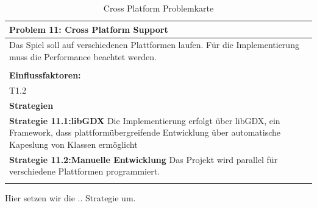 \documentclass[fontsize=12pt,paper=a4,twoside]{scrartcl}
\begin{document}
\begin{table}[H]
    \centering
    \begin{tabular}{|p{15cm}|}
    \hline
          \textbf{Problem 11: Cross Platform Support}  \\ \hline
	Das Spiel soll auf verschiedenen Plattformen laufen. Für die Implementierung muss die Performance beachtet werden. \\
         \\ \hline
          \textbf{Einflussfaktoren: } \\
	T1.2 \\
          \hline
          \textbf{Strategien} \\ \hline
            {}          
           \label{strategie:11.1}     
          \textbf{Strategie 11.1:libGDX} Die Implementierung erfolgt über libGDX, ein Framework, dass plattformübergreifende Entwicklung über automatische Kapeslung von Klassen ermöglicht \\        
  {}          
           \label{strategie:11.2}              
          \textbf{Strategie 11.2:Manuelle Entwicklung} Das Projekt wird parallel für verschiedene Plattformen programmiert.  \\
	 \\ \hline
    \end{tabular}

    \caption{Cross Platform Problemkarte}
    \label{tab:ProblemKarte11}
\end{table}
Hier setzen wir die .. Strategie um. \\
\end{document}
